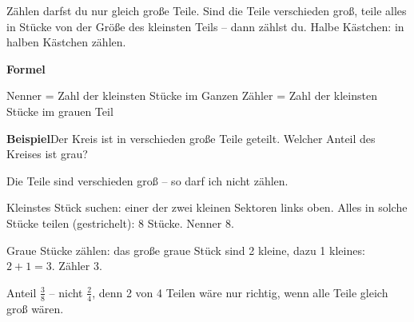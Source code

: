 \documentclass[11pt]{article}
\newlength{\kr}
\begin{document}
\fi\par
\clearpage\label{s:C}\noindent\colorbox{black!12}{}\hspace{3mm}{\Large\bfseries Ungleiche Teile: erst gleich groß machen}\par\smallskip
\noindent Zählen darfst du nur gleich große Teile. Sind die Teile verschieden groß, teile alles in Stücke von der Größe des kleinsten Teils – dann zählst du. Halbe Kästchen: in halben Kästchen zählen.\par\medskip
\noindent\textbf{Formel}\par\nopagebreak\noindent\hspace*{4mm}\begin{minipage}{\dimexpr\linewidth-4mm\relax}Nenner = Zahl der kleinsten Stücke im Ganzen \qquad Zähler = Zahl der kleinsten Stücke im grauen Teil\end{minipage}\par\medskip
\noindent\textbf{Beispiel}\quad Der Kreis ist in verschieden große Teile geteilt. Welcher Anteil des Kreises ist grau?\par\smallskip
\noindent\begin{minipage}[t]{0.6\linewidth}\vspace{0pt}\par\noindent{}Die Teile sind verschieden groß – so darf ich nicht zählen.\par\smallskip\par\noindent{}Kleinstes Stück suchen: einer der zwei kleinen Sektoren links oben. Alles in solche Stücke teilen (gestrichelt): 8 Stücke. Nenner 8.\par\smallskip\par\noindent{}Graue Stücke zählen: das große graue Stück sind 2 kleine, dazu 1 kleines: $2 + 1 = 3$. Zähler 3.\par\smallskip\par\noindent{}Anteil $\frac{3}{8}$ – nicht $\frac{2}{4}$, denn 2 von 4 Teilen wäre nur richtig, wenn alle Teile gleich groß wären.\par\smallskip\end{minipage}\hfill
\end{document}
